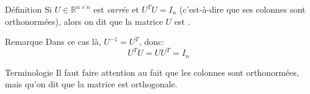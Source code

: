 \documentclass[a4paper]{article}
\begin{document}
\begin{parag}{Définition}
    Si $U \in \mathbb{R}^{n\times n}$ est \textit{carrée} et $U^T U = I_n$ (c'est-à-dire que ses colonnes sont orthonormées), alors on dit que la matrice $U$ est .

    \begin{subparag}{Remarque}
        Dans ce cas là, $U^{-1} = U^T$, donc:
        \[U^T U = UU^T = I_n\]
    \end{subparag}

    \begin{subparag}{Terminologie}
        Il faut faire attention au fait que les colonnes sont orthonormées, mais qu'on dit que la matrice est orthogonale.
    \end{subparag}


\end{parag}
\end{document}
